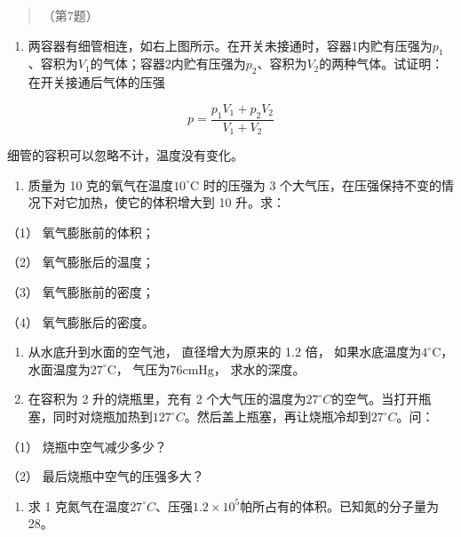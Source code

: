 \begin{quote}
（第7题）
\end{quote}

\begin{enumerate}
\def\labelenumi{\arabic{enumi}.}
\setcounter{enumi}{7}
\tightlist
\item
  两容器有细管相连，如右上图所示。在开关未接通时，容器1内贮有压强为\(p_{1}\)、容积为\(V_{1}\)的气体；容器2内贮有压强为\(p_{2}\)、容积为\(V_{2}\)的两种气体。试证明：在开关接通后气体的压强
\end{enumerate}

\[
p = \frac {p _ {1} V _ {1} + p _ {2} V _ {2}}{V _ {1} + V _ {2}}
\]

细管的容积可以忽略不计，温度没有变化。

\begin{enumerate}
\def\labelenumi{\arabic{enumi}.}
\setcounter{enumi}{8}
\tightlist
\item
  质量为 10 克的氧气在温度\(10^{\circ}\)C 时的压强为 3
  个大气压，在压强保持不变的情况下对它加热，使它的体积增大到 10 升。求：
\end{enumerate}

（1） 氧气膨胀前的体积；

（2） 氧气膨胀后的温度；

（3） 氧气膨胀前的密度；

（4） 氧气膨胀后的密度。

\begin{enumerate}
\def\labelenumi{\arabic{enumi}.}
\setcounter{enumi}{9}
\item
  从水底升到水面的空气池， 直径增大为原来的 1.2 倍，
  如果水底温度为\(4^{\circ} \mathrm{C}\)，
  水面温度为\(27^{\circ} \mathrm{C}\)， 气压为\(76 \mathrm{cmHg}\)，
  求水的深度。
\item
  在容积为 2 升的烧瓶里，充有 2
  个大气压的温度为\(27^{\circ}C\)的空气。当打开瓶塞，同时对烧瓶加热到\(127^{\circ}C\)。然后盖上瓶塞，再让烧瓶冷却到\(27^{\circ}C\)。问：
\end{enumerate}

（1） 烧瓶中空气减少多少？

（2） 最后烧瓶中空气的压强多大？

\begin{enumerate}
\def\labelenumi{\arabic{enumi}.}
\setcounter{enumi}{11}
\tightlist
\item
  求 1
  克氮气在温度\(27^{\circ}C\)、压强\(1.2 \times 10^{5}\)帕所占有的体积。已知氮的分子量为
  28。
\end{enumerate}

